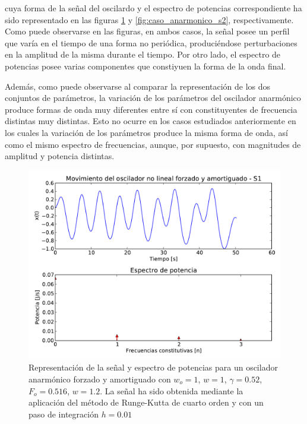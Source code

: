 \documentclass[11pt]{article}
\begin{document}
cuya forma de la señal del oscilardo y el espectro de potencias correspondiente ha sido representado en las figuras \ref{fig:caso_anarmonico_s1} y \ref{fig:caso_anarmonico_s2}, respectivamente. Como puede observarse en las figuras, en ambos casos, la señal posee un perfil que varía en el tiempo de una forma no periódica, produciéndose perturbaciones en la amplitud de la misma durante el tiempo. Por otro lado, el espectro de potencias posee varias componentes que constiyuen la forma de la onda final. 

Además, como puede observarse al comparar la representación de los dos conjuntos de parámetros, la variación de los parámetros del oscilador anarmónico produce formas de onda muy diferentes entre sí con constituyentes de frecuencia distintas muy distintas. Esto no ocurre en los casos estudiados anteriormente en los cuales la variación de los parámetros produce la misma forma de onda, así como el mismo espectro de frecuencias, aunque, por supuesto, con magnitudes de amplitud y potencia distintas.

\begin{figure}
\centering
\includegraphics[width=0.75\linewidth]{caso_anarmonico_s1.pdf}
\caption{Representación de la señal y espectro de potencias para un oscilador anarmónico forzado y amortiguado con $w_o = 1$, $w = 1$, $\gamma = 0.52$, $F_o = 0.516$, $w = 1.2$. La señal ha sido obtenida mediante la aplicación del método de Runge-Kutta de cuarto orden y con un paso de integración $h = 0.01$}
\label{fig:caso_anarmonico_s1}
\end{figure}
\end{document}

